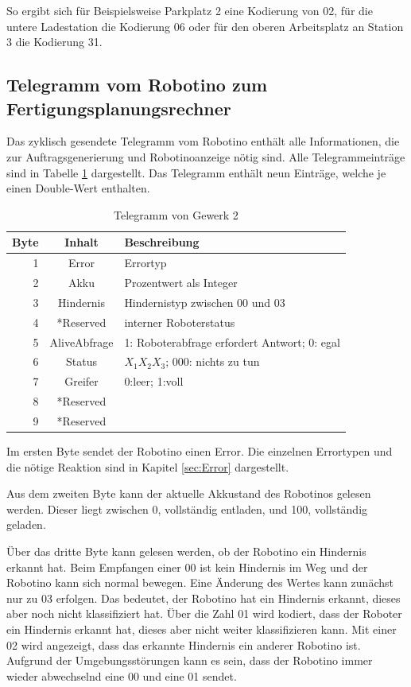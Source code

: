 So ergibt sich für Beispielsweise Parkplatz 2 eine Kodierung von 02, für die untere Ladestation die Kodierung 06 oder für den oberen Arbeitsplatz an Station 3 die Kodierung 31.

\subsection{Telegramm vom Robotino zum Fertigungsplanungsrechner}

Das zyklisch gesendete Telegramm vom Robotino enthält alle Informationen, die zur Auftragsgenerierung und Robotinoanzeige nötig sind. Alle Telegrammeinträge sind in Tabelle \ref{tab:TelegrammVonG2} dargestellt. Das Telegramm enthält neun Einträge, welche je einen Double-Wert enthalten. 

\begin{table}[!ht]
	\centering
	\begin{tabular}{|r|c|l|}
		\hline
		Byte & Inhalt	&	Beschreibung \\
		\hline
			1  & Error &  Errortyp  \\
			2  & Akku  & Prozentwert als Integer \\
			3  & Hindernis & Hindernistyp zwischen 00 und 03\\
		  4  & *Reserved &  interner Roboterstatus \\
		  5  & AliveAbfrage  & 1: Roboterabfrage erfordert Antwort; 0: egal \\
		  6  & Status & $X_1X_2X_3$; 000: nichts zu tun \\
		  7  & Greifer   & 0:leer; 1:voll \\
		  8  & *Reserved &  \\
		  9  & *Reserved   &  \\
		\hline
	\end{tabular}
	\caption{Telegramm von Gewerk 2}
	\label{tab:TelegrammVonG2}
\end{table}

Im ersten Byte sendet der Robotino einen Error. Die einzelnen Errortypen und die nötige Reaktion sind in Kapitel \ref{sec:Error} dargestellt. 

Aus dem zweiten Byte kann der aktuelle Akkustand des Robotinos gelesen werden. Dieser liegt zwischen 0, vollständig entladen, und 100, vollständig geladen. 

Über das dritte Byte kann gelesen werden, ob der Robotino ein Hindernis erkannt hat. Beim Empfangen einer 00 ist kein Hindernis im Weg und der Robotino kann sich normal bewegen. Eine Änderung des Wertes kann zunächst nur zu 03 erfolgen. Das bedeutet, der Robotino hat ein Hindernis erkannt, dieses aber noch nicht klassifiziert hat. Über die Zahl 01 wird kodiert, dass der Roboter ein Hindernis erkannt hat, dieses aber nicht weiter klassifizieren kann. Mit einer 02 wird angezeigt, dass das erkannte Hindernis ein anderer Robotino ist. Aufgrund der Umgebungsstörungen kann es sein, dass der Robotino immer wieder abwechselnd eine 00 und eine 01 sendet. 

